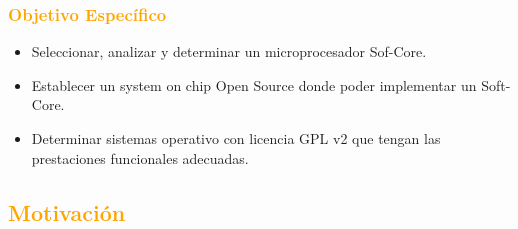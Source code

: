 \documentclass[a4paper,11pt]{article}
\begin{document}
\subsubsection{\textcolor{orange}{Objetivo Específico}}
\begin{itemize}
\item Seleccionar, analizar y determinar un microprocesador Sof-Core.
\item Establecer un system on chip Open Source donde poder implementar un Soft-Core.
\item Determinar sistemas operativo con licencia GPL v2 que tengan las prestaciones funcionales adecuadas.
\end{itemize}

\subsection{\textcolor{orange}{Motivación}}
\end{document}
